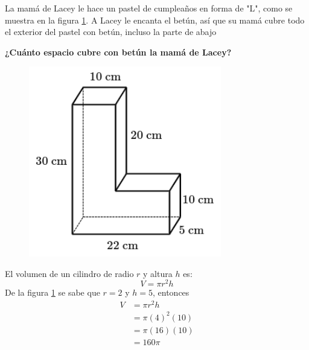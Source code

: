 \question[10] La mamá de Lacey le hace un pastel de cumpleaños en forma de "L", como se muestra en la figura \ref{fig:vol_area_02}.
A Lacey le encanta el betún, así que su mamá cubre todo el exterior del pastel con betún, incluso la parte de abajo

\textbf{¿Cuánto espacio cubre con betún la mamá de Lacey?}\\

\begin{minipage}{0.3\linewidth}
    \begin{figure}[H]
        \begin{center}
            \includegraphics[width=0.75\textwidth]{../images/vol_area_02}
        \end{center}
        \caption{}
        \label{fig:vol_area_02}
    \end{figure}
\end{minipage}
\begin{minipage}{0.7\linewidth}
    \begin{solutionbox}{6cm}        El volumen de un cilindro de radio $r$ y altura $h$ es:
        \begin{equation*}
            V = \pi r^2 h
        \end{equation*}
        De la figura \ref{fig:vol_area_02} se sabe que $r=2$ y $h=5$, entonces
        \begin{equation*}
            \begin{split}
                V & = \pi r^2 h\\
                & = \pi (4)^2 (10)\\
                & = \pi (16) (10)\\
                & = 160\pi
            \end{split}
        \end{equation*}
    \end{solutionbox}
\end{minipage}